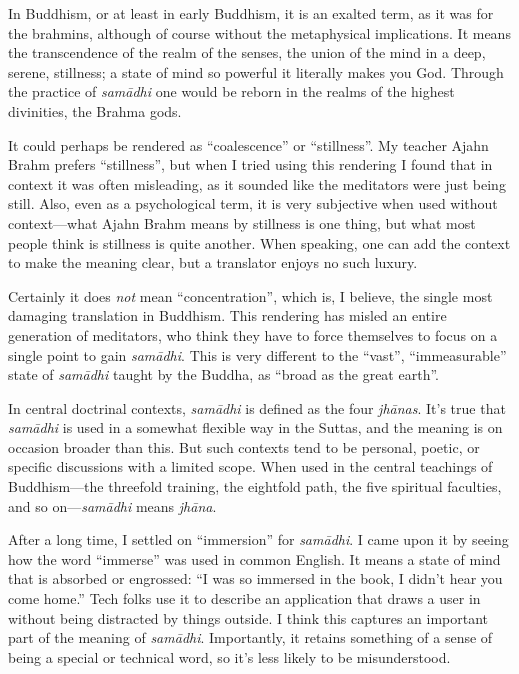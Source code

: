 \documentclass[12pt,openany]{book}%
\begin{document}
In Buddhism, or at least in early Buddhism, it is an exalted term, as it was for the brahmins, although of course without the metaphysical implications. It means the transcendence of the realm of the senses, the union of the mind in a deep, serene, stillness; a state of mind so powerful it literally makes you God. Through the practice of \textit{\textsanskrit{samādhi}} one would be reborn in the realms of the highest divinities, the Brahma gods.

It could perhaps be rendered as “coalescence” or “stillness”. My teacher Ajahn Brahm prefers “stillness”, but when I tried using this rendering I found that in context it was often misleading, as it sounded like the meditators were just being still. Also, even as a psychological term, it is very subjective when used without context—what Ajahn Brahm means by stillness is one thing, but what most people think is stillness is quite another. When speaking, one can add the context to make the meaning clear, but a translator enjoys no such luxury.

Certainly it does \emph{not} mean “concentration”, which is, I believe, the single most damaging translation in Buddhism. This rendering has misled an entire generation of meditators, who think they have to force themselves to focus on a single point to gain \textit{\textsanskrit{samādhi}}. This is very different to the “vast”, “immeasurable” state of \textit{\textsanskrit{samādhi}} taught by the Buddha, as “broad as the great earth”.

In central doctrinal contexts, \textit{\textsanskrit{samādhi}} is defined as the four \textit{\textsanskrit{jhānas}}. It’s true that  \textit{\textsanskrit{samādhi}} is used in a somewhat flexible way in the Suttas, and the meaning is on occasion broader than this. But such contexts tend to be personal, poetic, or specific discussions with a limited scope. When used in the central teachings of Buddhism—the threefold training, the eightfold path, the five spiritual faculties, and so on—\textit{\textsanskrit{samādhi}} means \textit{\textsanskrit{jhāna}}.

After a long time, I settled on “immersion” for \textit{\textsanskrit{samādhi}}. I came upon it by seeing how the word “immerse” was used in common English. It means a state of mind that is absorbed or engrossed: “I was so immersed in the book, I didn’t hear you come home.” Tech folks use it to describe an application that draws a user in without being distracted by things outside. I think this captures an important part of the meaning of \textit{\textsanskrit{samādhi}}. Importantly, it retains something of a sense of being a special or technical word, so it’s less likely to be misunderstood.
\end{document}

